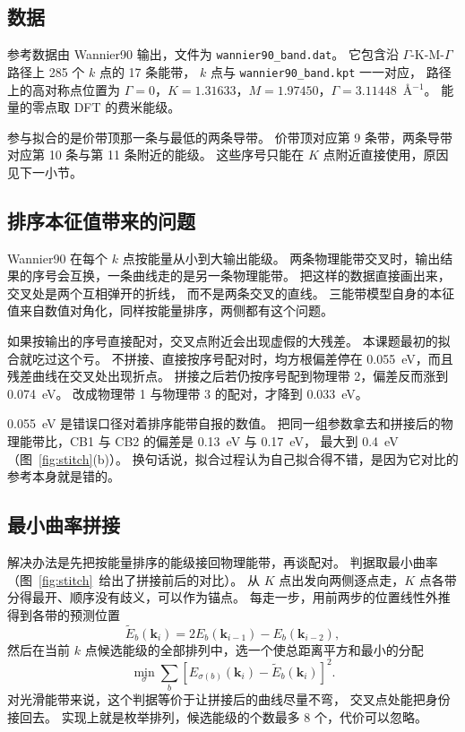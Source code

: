 \documentclass[11pt,a4paper]{ctexart}
\newcommand{\kk}{\mathbf{k}}
\begin{document}
\subsection{数据}

参考数据由 Wannier90 输出，文件为 \texttt{wannier90\_band.dat}。
它包含沿 $\Gamma$-K-M-$\Gamma$ 路径上 285 个 $k$ 点的 17 条能带，
$k$ 点与 \texttt{wannier90\_band.kpt} 一一对应，
路径上的高对称点位置为
$\Gamma=0$，$K=1.31633$，$M=1.97450$，$\Gamma=3.11448$~\AA$^{-1}$。
能量的零点取 DFT 的费米能级。

参与拟合的是价带顶那一条与最低的两条导带。
价带顶对应第 9 条带，两条导带对应第 10 条与第 11 条附近的能级。
这些序号只能在 $K$ 点附近直接使用，原因见下一小节。

\subsection{排序本征值带来的问题}

Wannier90 在每个 $k$ 点按能量从小到大输出能级。
两条物理能带交叉时，输出结果的序号会互换，一条曲线走的是另一条物理能带。
把这样的数据直接画出来，交叉处是两个互相弹开的折线，
而不是两条交叉的直线。
三能带模型自身的本征值来自数值对角化，同样按能量排序，两侧都有这个问题。

如果按输出的序号直接配对，交叉点附近会出现虚假的大残差。
本课题最初的拟合就吃过这个亏。
不拼接、直接按序号配对时，均方根偏差停在 0.055~eV，而且残差曲线在交叉处出现折点。
拼接之后若仍按序号配到物理带 2，偏差反而涨到 0.074~eV。
改成物理带 1 与物理带 3 的配对，才降到 0.033~eV。

0.055~eV 是错误口径对着排序能带自报的数值。
把同一组参数拿去和拼接后的物理能带比，CB1 与 CB2 的偏差是 0.13~eV 与 0.17~eV，
最大到 0.4~eV（图~\ref{fig:stitch}(b)）。
换句话说，拟合过程认为自己拟合得不错，是因为它对比的参考本身就是错的。


\subsection{最小曲率拼接}

解决办法是先把按能量排序的能级接回物理能带，再谈配对。
判据取最小曲率（图~\ref{fig:stitch}~给出了拼接前后的对比）。
从 $K$ 点出发向两侧逐点走，$K$ 点各带分得最开、顺序没有歧义，可以作为锚点。
每走一步，用前两步的位置线性外推得到各带的预测位置
\begin{equation}
\tilde{E}_b(\kk_i)=2E_b(\kk_{i-1})-E_b(\kk_{i-2}),
\end{equation}
然后在当前 $k$ 点候选能级的全部排列中，选一个使总距离平方和最小的分配
\begin{equation}
\min_{\sigma}\sum_b\left[E_{\sigma(b)}(\kk_i)-\tilde{E}_b(\kk_i)\right]^2 .
\end{equation}
对光滑能带来说，这个判据等价于让拼接后的曲线尽量不弯，
交叉点处能把身份接回去。
实现上就是枚举排列，候选能级的个数最多 8 个，代价可以忽略。
\end{document}

